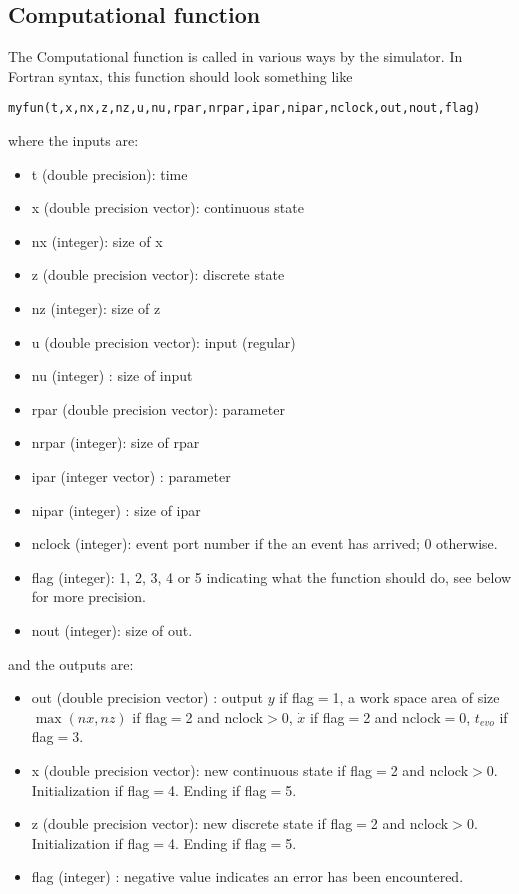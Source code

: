 \subsection{Computational function}
The Computational function is called in various ways by the
simulator. In Fortran syntax, this function should look something like 
\begin{verbatim}
myfun(t,x,nx,z,nz,u,nu,rpar,nrpar,ipar,nipar,nclock,out,nout,flag)
\end{verbatim}
where the inputs are:
\begin{itemize}
\item t (double precision): time
\item x (double precision vector): continuous state
\item nx (integer): size of x
\item z (double precision vector): discrete state
\item nz (integer): size of z
\item u (double precision vector): input (regular)
\item nu (integer) : size of input
\item rpar (double precision vector): parameter
\item nrpar (integer): size of rpar
\item ipar (integer vector) : parameter
\item nipar (integer) : size of ipar
\item nclock (integer): event port number if the an event has arrived; 0
otherwise.
\item flag (integer): 1, 2, 3, 4 or 5 indicating what the function
  should do, see below for more precision.
\item nout (integer): size of out.
\end{itemize}
and the outputs are:
\begin{itemize}
\item out (double precision vector) : output $y$ if flag$=$1, a work
space area of size $\max(nx,nz)$ if flag$=$2 and nclock$>0$, $\dot{x}$
if  flag$=$2 and nclock$=$0, $t_{evo}$ if flag$=$3. 
\item x (double precision vector): new continuous state if flag$=$2 and
nclock$>0$. Initialization if flag$=$4. Ending if flag$=$5.
\item z (double precision vector): new discrete state if flag$=$2 and
nclock$>0$.  Initialization if flag$=$4. Ending if flag$=$5.
\item flag (integer) : negative value indicates an error has been
encountered. 
\end{itemize}

